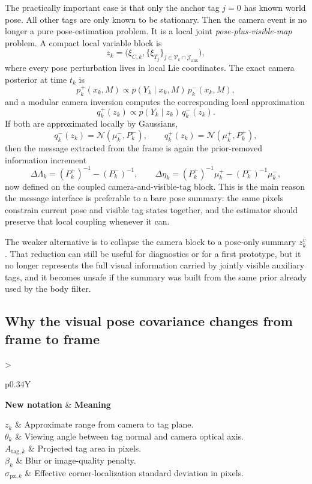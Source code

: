 \documentclass[11pt]{report}
\newcommand{\Normal}{\mathcal{N}}
\newcommand{\NotationTable}[1]{%
\vspace{0.6mm}
{\scriptsize
\setlength{\tabcolsep}{2.5pt}
\begin{tabularx}{\columnwidth}{>{\raggedright\arraybackslash}p{0.34\columnwidth}Y}
\toprule
\textbf{New notation} & \textbf{Meaning}\\
\midrule
#1\\
\bottomrule
\end{tabularx}}
\vspace{0.8mm}}
\begin{document}
The practically important case is that only the anchor tag $j=0$ has known world pose. All other tags are only known to be stationary. Then the camera event is no longer a pure pose-estimation problem. It is a local joint \emph{pose-plus-visible-map} problem. A compact local variable block is
\[
z_k = \bigl(\xi_{C,k},\{\xi_{T_j}\}_{j\in \mathcal V_k\cap\mathcal J_{\mathrm{aux}}}\bigr),
\]
where every pose perturbation lives in local Lie coordinates. The exact camera posterior at time $t_k$ is
\begin{equation}
p^+_k(x_k,M)\propto p(Y_k\mid x_k,M)\,p^-_k(x_k,M),
\label{eq:joint_window_pose_map_sweep}
\end{equation}
and a modular camera inversion computes the corresponding local approximation
\[
q^+_k(z_k)\propto p(Y_k\mid z_k)\,q^-_k(z_k).
\]
If both are approximated locally by Gaussians,
\[
q^-_k(z_k)=\Normal(\mu^-_k,P^-_k),
\qquad
q^+_k(z_k)=\Normal(\mu^+_k,P^+_k),
\]
then the message extracted from the frame is again the prior-removed information increment
\begin{equation}
\Delta\Lambda_k = (P^+_k)^{-1}-(P^-_k)^{-1},
\qquad
\Delta\eta_k = (P^+_k)^{-1}\mu^+_k-(P^-_k)^{-1}\mu^-_k,
\label{eq:prior_removed_message_joint}
\end{equation}
now defined on the coupled camera-and-visible-tag block. This is the main reason the message interface is preferable to a bare pose summary: the same pixels constrain current pose and visible tag states together, and the estimator should preserve that local coupling whenever it can.

The weaker alternative is to collapse the camera block to a pose-only summary $z_k^v$. That reduction can still be useful for diagnostics or for a first prototype, but it no longer represents the full visual information carried by jointly visible auxiliary tags, and it becomes unsafe if the summary was built from the same prior already used by the body filter.

\subsection{Why the visual pose covariance changes from frame to frame}
\NotationTable{
$z_k$ & Approximate range from camera to tag plane.\\
$\theta_k$ & Viewing angle between tag normal and camera optical axis.\\
$A_{\mathrm{tag},k}$ & Projected tag area in pixels.\\
$\beta_k$ & Blur or image-quality penalty.\\
$\sigma_{\mathrm{px},k}$ & Effective corner-localization standard deviation in pixels.}
\end{document}
